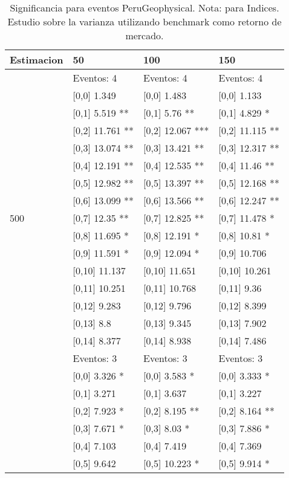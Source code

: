 \begin{table}

\caption{Significancia para eventos PeruGeophysical. Nota: para Indices. Estudio sobre la varianza utilizando benchmark como retorno de mercado.}
\centering
\begin{tabular}[t]{llll}
\toprule
Estimacion & 50 & 100 & 150\\
\midrule
 & Eventos:  4 & Eventos:  4 & Eventos:  4\\
 & {}[0,0] 1.349 & {}[0,0] 1.483 & {}[0,0] 1.133\\
 & {}[0,1] 5.519 ** & {}[0,1] 5.76 ** & {}[0,1] 4.829 *\\
 & {}[0,2] 11.761 ** & {}[0,2] 12.067 *** & {}[0,2] 11.115 **\\
 & {}[0,3] 13.074 ** & {}[0,3] 13.421 ** & {}[0,3] 12.317 **\\
\addlinespace
 & {}[0,4] 12.191 ** & {}[0,4] 12.535 ** & {}[0,4] 11.46 **\\
 & {}[0,5] 12.982 ** & {}[0,5] 13.397 ** & {}[0,5] 12.168 **\\
 & {}[0,6] 13.099 ** & {}[0,6] 13.566 ** & {}[0,6] 12.247 **\\
500 & {}[0,7] 12.35 ** & {}[0,7] 12.825 ** & {}[0,7] 11.478 *\\
 & {}[0,8] 11.695 * & {}[0,8] 12.191 * & {}[0,8] 10.81 *\\
\addlinespace
 & {}[0,9] 11.591 * & {}[0,9] 12.094 * & {}[0,9] 10.706\\
 & {}[0,10] 11.137 & {}[0,10] 11.651 & {}[0,10] 10.261\\
 & {}[0,11] 10.251 & {}[0,11] 10.768 & {}[0,11] 9.36\\
 & {}[0,12] 9.283 & {}[0,12] 9.796 & {}[0,12] 8.399\\
 & {}[0,13] 8.8 & {}[0,13] 9.345 & {}[0,13] 7.902\\
\addlinespace
 & {}[0,14] 8.377 & {}[0,14] 8.938 & {}[0,14] 7.486\\
 & Eventos:  3 & Eventos:  3 & Eventos:  3\\
 & {}[0,0] 3.326 * & {}[0,0] 3.583 * & {}[0,0] 3.333 *\\
 & {}[0,1] 3.271 & {}[0,1] 3.637 & {}[0,1] 3.227\\
 & {}[0,2] 7.923 * & {}[0,2] 8.195 ** & {}[0,2] 8.164 **\\
\addlinespace
 & {}[0,3] 7.671 * & {}[0,3] 8.03 * & {}[0,3] 7.886 *\\
 & {}[0,4] 7.103 & {}[0,4] 7.419 & {}[0,4] 7.369\\
 & {}[0,5] 9.642 & {}[0,5] 10.223 * & {}[0,5] 9.914 *\\

\end{tabular}
\end{table}
